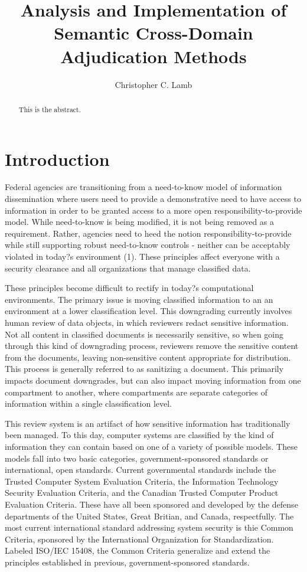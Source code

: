 \documentclass[10pt,letterpaper]{article}
\author{Christopher C. Lamb}
\title{Analysis and Implementation of Semantic Cross-Domain Adjudication Methods}
\begin{document}
\maketitle
\begin{abstract}
This is the abstract.
\end{abstract}
\section{Introduction}
Federal agencies are transitioning from a need-to-know model of information dissemination where users need to provide a demonstrative need to have access to information in order to be granted access to a more open responsibility-to-provide model.  While need-to-know is being modified, it is not being removed as a requirement.  Rather, agencies need to heed the notion responsibility-to-provide  while still supporting robust need-to-know controls - neither can be acceptably violated in today?s environment (1).  These principles affect everyone with a security clearance and all organizations that manage classified data.

These principles become difficult to rectify in today?s computational environments.  The primary issue is moving classified information to an an environment at a lower classification level.  This downgrading currently involves human review of data objects, in which reviewers redact sensitive information.  Not all content in classified documents is necessarily sensitive, so when going through this kind of downgrading process, reviewers remove the sensitive content from the documents, leaving non-sensitive content appropriate for distribution.  This process is generally referred to as sanitizing a document.  This primarily impacts document downgrades, but can also impact moving information from one compartment to another, where compartments are separate categories of information within a single classification level.

This review system is an artifact of how sensitive information has traditionally been managed.  To this day, computer systems are classified by the kind of information they can contain based on one of a variety of possible models.  These models fall into two basic categories, government-sponsored standards or international, open standards.  Current governmental standards include the Trusted Computer System Evaluation Criteria, the Information Technology Security Evaluation Criteria, and the Canadian Trusted Computer Product Evaluation Criteria.  These have all been sponsored and developed by the defense departments of the United States, Great Britian, and Canada, respectfully.  The most current international standard addressing system security is thie Common Criteria, sponsored by the International Organization for Standardization.  Labeled ISO/IEC 15408, the Common Criteria generalize and extend the principles established in previous, government-sponsored standards.
\end{document}
